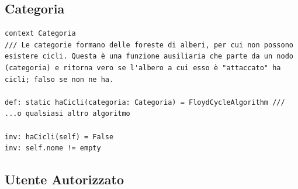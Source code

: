 \documentclass{article}
\begin{document}
\subsection{Categoria}

\begin{verbatim}
context Categoria
/// Le categorie formano delle foreste di alberi, per cui non possono esistere cicli. Questa è una funzione ausiliaria che parte da un nodo (categoria) e ritorna vero se l'albero a cui esso è "attaccato" ha cicli; falso se non ne ha.

def: static haCicli(categoria: Categoria) = FloydCycleAlgorithm /// ...o qualsiasi altro algoritmo

inv: haCicli(self) = False
inv: self.nome != empty
\end{verbatim}

\clearpage

\subsection{Utente Autorizzato}
\end{document}

